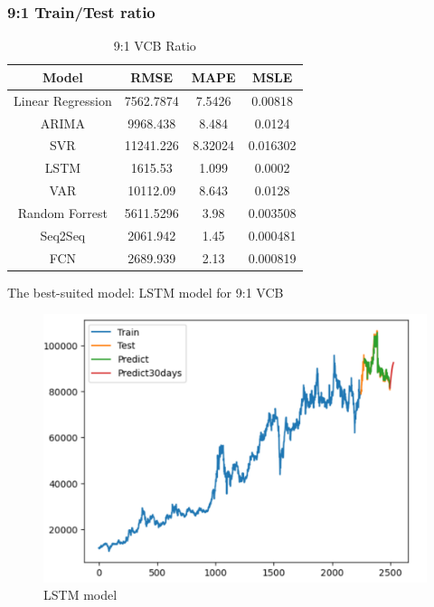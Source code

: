 \documentclass{ieeeojies}
\begin{document}
\subsubsection{9:1 Train/Test ratio}
\begin{table}[H]
    \centering
    \begin{tabular}{|c|c|c|c|}
    \hline
      Model & \textbf{RMSE} & \textbf{MAPE} & \textbf{MSLE} \\
        \hline
        Linear Regression & 7562.7874 & 7.5426 & 0.00818 \\
        \hline
        ARIMA & 9968.438 & 8.484 & 0.0124 \\
        \hline
        SVR & 11241.226 & 8.32024 & 0.016302 \\
        \hline
        \rowcolor{red!10}
        LSTM & 1615.53 & 1.099 & 0.0002 \\
        \hline
        VAR & 10112.09 & 8.643 & 0.0128 \\
        \hline
        Random Forrest & 5611.5296 & 3.98 & 0.003508 \\
        \hline
        Seq2Seq & 2061.942 & 1.45 & 0.000481 \\
        \hline
        FCN & 2689.939 & 2.13 & 0.000819 \\
        \hline
    \end{tabular}
    \caption{9:1 VCB Ratio}
    \label{tab:my_label}
\end{table}
The best-suited model: LSTM model for 9:1 VCB
\begin{figure}[H]
    \centering
    \includegraphics[width=1\linewidth]{vcb_lstm_91.png}
    \caption{LSTM model}
    \label{fig:enter-label}
\end{figure}
\end{document}
